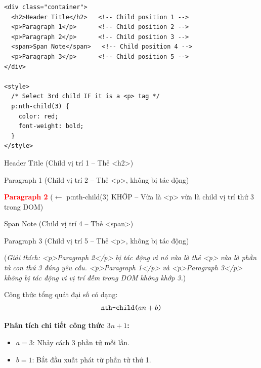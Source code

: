 \begin{codeWindow}
\begin{lstlisting}[language=HTML5]
<div class="container">
  <h2>Header Title</h2>   <!-- Child position 1 -->
  <p>Paragraph 1</p>      <!-- Child position 2 -->
  <p>Paragraph 2</p>      <!-- Child position 3 -->
  <span>Span Note</span>   <!-- Child position 4 -->
  <p>Paragraph 3</p>      <!-- Child position 5 -->
</div>

<style>
  /* Select 3rd child IF it is a <p> tag */
  p:nth-child(3) {
    color: red;
    font-weight: bold;
  }
</style>
\end{lstlisting}
\end{codeWindow}

\begin{browserWindow}
\sffamily\small
Header Title {\scriptsize\textcolor{gray!60}{(Child vị trí 1 -- Thẻ <h2>)}} \par\vspace{2pt}
Paragraph 1 {\scriptsize\textcolor{gray!60}{(Child vị trí 2 -- Thẻ <p>, không bị tác động)}} \par\vspace{2pt}
\textcolor{red}{\textbf{Paragraph 2}} {\scriptsize\textcolor{gray!60}{($\leftarrow$ p:nth-child(3) KHỚP -- Vừa là <p> vừa là child vị trí thứ 3 trong DOM)}} \par\vspace{2pt}
Span Note {\scriptsize\textcolor{gray!60}{(Child vị trí 4 -- Thẻ <span>)}} \par\vspace{2pt}
Paragraph 3 {\scriptsize\textcolor{gray!60}{(Child vị trí 5 -- Thẻ <p>, không bị tác động)}} \par\vspace{4pt}
{\scriptsize\textcolor{gray!60}{(\textit{Giải thích: <p>Paragraph 2</p> bị tác động vì nó vừa là thẻ <p> vừa là phần tử con thứ 3 đúng yêu cầu. <p>Paragraph 1</p> và <p>Paragraph 3</p> không bị tác động vì vị trí đếm trong DOM không khớp 3.})}}
\end{browserWindow}

\begin{conceptBox}
Công thức tổng quát đại số có dạng:
\[ \text{\texttt{nth-child(}} a n + b \text{\texttt{)}} \]
\par\vspace{4pt}
\textbf{Phân tích chi tiết công thức $3n + 1$:}
\begin{itemize}[leftmargin=1.5em, itemsep=1pt, parsep=0pt]
    \item $a = 3$: Nhảy cách 3 phần tử mỗi lần.
    \item $b = 1$: Bắt đầu xuất phát từ phần tử thứ 1.
\end{itemize}
\end{conceptBox}

